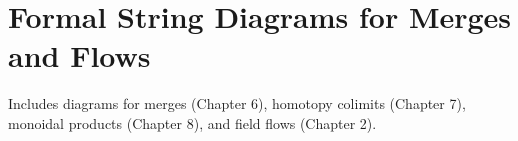 \section{Formal String Diagrams for Merges and Flows}
\label{app:diagrams}

Includes diagrams for merges (Chapter 6), homotopy colimits (Chapter 7), monoidal products (Chapter 8), and field flows (Chapter 2).

